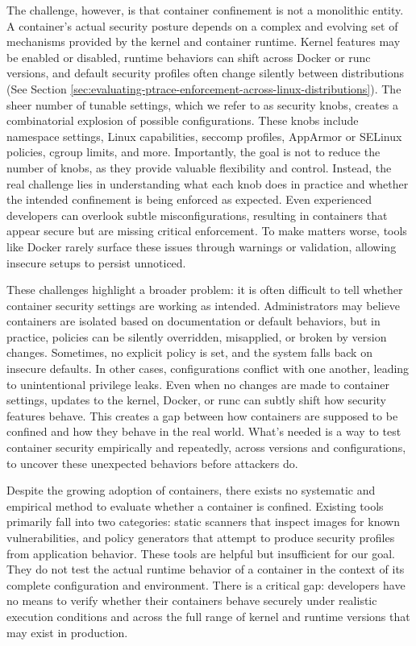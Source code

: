 \begin{doublespace}
The challenge, however, is that container confinement is not a monolithic entity. A container’s actual security posture depends on a complex and evolving set of mechanisms provided by the kernel and container runtime. Kernel features may be enabled or disabled, runtime behaviors can shift across Docker or runc versions, and default security profiles often change silently between distributions (See Section \ref{sec:evaluating-ptrace-enforcement-across-linux-distributions}). The sheer number of tunable settings, which we refer to as security knobs, creates a combinatorial explosion of possible configurations. These knobs include namespace settings, Linux capabilities, seccomp profiles, AppArmor or SELinux policies, cgroup limits, and more. Importantly, the goal is not to reduce the number of knobs, as they provide valuable flexibility and control. Instead, the real challenge lies in understanding what each knob does in practice and whether the intended confinement is being enforced as expected. Even experienced developers can overlook subtle misconfigurations, resulting in containers that appear secure but are missing critical enforcement. To make matters worse, tools like Docker rarely surface these issues through warnings or validation, allowing insecure setups to persist unnoticed.

These challenges highlight a broader problem: it is often difficult to tell whether container security settings are working as intended. Administrators may believe containers are isolated based on documentation or default behaviors, but in practice, policies can be silently overridden, misapplied, or broken by version changes. Sometimes, no explicit policy is set, and the system falls back on insecure defaults. In other cases, configurations conflict with one another, leading to unintentional privilege leaks. Even when no changes are made to container settings, updates to the kernel, Docker, or runc can subtly shift how security features behave. This creates a gap between how containers are supposed to be confined and how they behave in the real world. What’s needed is a way to test container security empirically and repeatedly, across versions and configurations, to uncover these unexpected behaviors before attackers do.

Despite the growing adoption of containers, there exists no systematic and empirical method to evaluate whether a container is confined. Existing tools primarily fall into two categories: static scanners that inspect images for known vulnerabilities, and policy generators that attempt to produce security profiles from application behavior. These tools are helpful but insufficient for our goal. They do not test the actual runtime behavior of a container in the context of its complete configuration and environment. There is a critical gap: developers have no means to verify whether their containers behave securely under realistic execution conditions and across the full range of kernel and runtime versions that may exist in production.


\end{doublespace}
